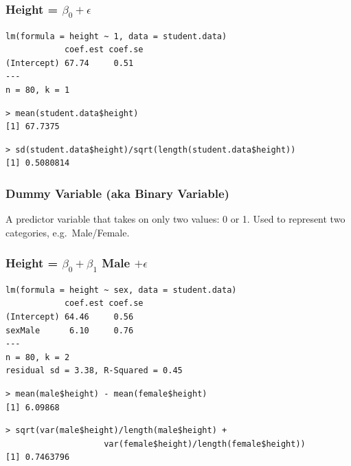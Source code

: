 \begin{frame}[fragile]
\frametitle{Height = $\beta_0 +  \epsilon$}
\footnotesize
\begin{verbatim}
lm(formula = height ~ 1, data = student.data)
            coef.est coef.se
(Intercept) 67.74     0.51  
---
n = 80, k = 1
\end{verbatim}
\pause
\begin{verbatim}
> mean(student.data$height)
[1] 67.7375
\end{verbatim}
\pause
\begin{verbatim}
> sd(student.data$height)/sqrt(length(student.data$height))
[1] 0.5080814
\end{verbatim}
\end{frame}

\begin{frame}
\frametitle{Dummy Variable (aka Binary Variable)}
 
A predictor variable that takes on only two values: 0 or 1. Used to represent two categories, e.g.\ Male/Female.
\end{frame}



\begin{frame}[fragile]
\frametitle{Height = $\beta_0 + \beta_1$ Male $+ \epsilon$}

\footnotesize
\begin{verbatim}
lm(formula = height ~ sex, data = student.data)
            coef.est coef.se
(Intercept) 64.46     0.56  
sexMale      6.10     0.76  
---
n = 80, k = 2
residual sd = 3.38, R-Squared = 0.45
\end{verbatim}
\pause
\begin{verbatim}
> mean(male$height) - mean(female$height)
[1] 6.09868
\end{verbatim}
\pause
\begin{verbatim}
> sqrt(var(male$height)/length(male$height) +
		 			var(female$height)/length(female$height))
[1] 0.7463796
\end{verbatim}
\end{frame}




